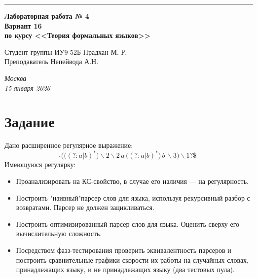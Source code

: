 \documentclass[a4paper, 14pt]{extarticle}
\begin{document}
\begin{titlepage}
\vspace*{-16pt}
\hspace{30pt}\rule{0.866\textwidth}{0.4pt}
  
\vspace{11em}

\begin{center}
\Large {\bf Лабораторная работа № 4} \\ 
\large {\bf Вариант 16} \\
\large {\bf по курсу <<Теория формальных языков>>} \\
\end{center}\normalsize

\vspace{8em}


\begin{flushright}
  {Студент группы ИУ9-52Б Прадхан М. Р. \hspace*{15pt}\\ 
  \vspace{2ex}
  Преподаватель Непейвода А.Н. \hspace*{15pt}}
\end{flushright}


\bigskip

\vfill
 

\begin{center}
\textsl{Москва} \\
\textsl{15 января 2026}
\end{center}
\end{titlepage}

\newpage

\section{Задание}
Дано расширенное регулярное выражение: 
\[
\hat{ } \Big( \big( (?: a | b)^* \big) \backslash 2 \backslash 2 \, a \, \big( (?: a | b)^* \big) \, b \, \backslash 3 \Big) \backslash 1? \$
\]
Имеющуюся регулярку:
\begin{itemize}
\item[---] Проанализировать на КС-свойство, в случае его наличия — на регулярность.
\item[---] Построить "наивный"парсер слов для языка, используя рекурсивный разбор
с возвратами. Парсер не должен зацикливаться.
\item[---]  Построить оптимизированный парсер слов для языка. Оценить сверху его
вычислительную сложность.
\item[---]  Посредством фазз-тестирования проверить эквивалентность парсеров и построить сравнительные графики скорости их работы на случайных словах,
принадлежащих языку, и не принадлежащих языку (два тестовых пула).
\end{itemize}
\newpage
\end{document}
